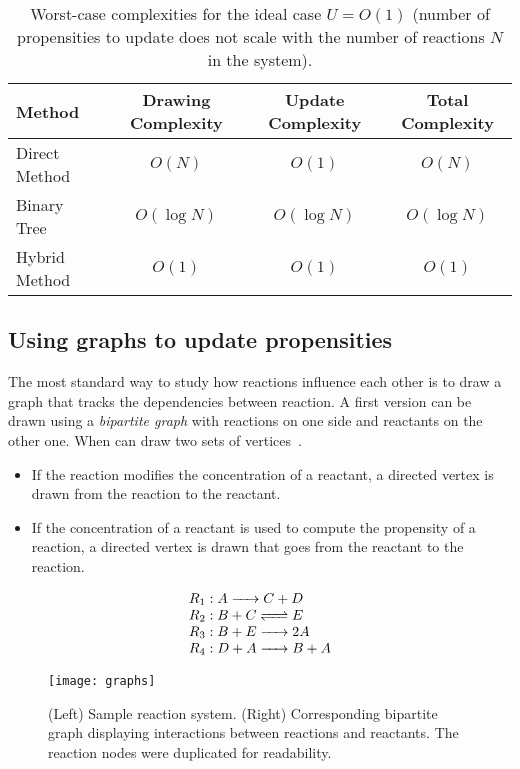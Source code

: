 \begin{table}[!h]
  \centering
  \begin{tabular}{|l|c|c|c|}
    \hline
    Method & Drawing Complexity & Update Complexity & Total Complexity\\
    \hline
    Direct Method & $O(N)$ & $O(1)$ & $O(N)$\\
    Binary Tree & $O(\log N)$ & $O(\log N)$ & $O(\log N)$\\
    Hybrid Method & $O(1)$ & $O(1)$ & $O(1)$\\
    \hline
  \end{tabular}
  \caption{Worst-case complexities for the ideal case $U=O(1)$ (number of propensities to update does not scale with the number of reactions $N$ in the system).}
  \label{tab:ideal_update}
\end{table}	

\subsection{Using graphs to update propensities}

The most standard way to study how reactions influence each other is to draw a graph that tracks the dependencies between reaction. A first version can be drawn using a \emph{bipartite graph} with reactions on one side and reactants on the other one. When can draw two sets of vertices~.
\begin{itemize}
  \item If the reaction modifies the concentration of a reactant, a directed vertex is drawn from the reaction to the reactant.
  \item If the concentration of a reactant is used to compute the propensity of a reaction, a directed vertex is drawn that goes from the reactant to the reaction.
\end{itemize}

\begin{figure}[!h]
  \centering
  \begin{minipage}{0.39\textwidth}
    \[
    \begin{array}{l}
      R_1:\reactionIrr{A}{C+D}{}{} \\
      R_2:\reactionRev{B+C}{E}{}{} \\
      R_3:\reactionIrr{B+E}{2A}{}{} \\
      R_4:\reactionIrr{D+A}{B+A}{}{}
    \end{array}
    \]
  \end{minipage}
  \begin{minipage}{0.59\textwidth}
    \texttt{[image: graphs]}
  \end{minipage}
  \caption{(Left) Sample reaction system. (Right) Corresponding bipartite graph displaying interactions between reactions and reactants. The reaction nodes were duplicated for readability.}
  \label{fig:reactant_reaction_graph}
\end{figure}

